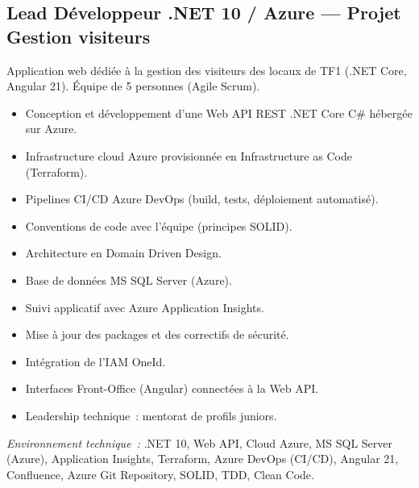 \documentclass[10pt,a4paper]{article}
\begin{document}
\subsection*{Lead Développeur .NET 10 / Azure --- Projet Gestion visiteurs}
\color{darkgray}
Application web dédiée à la gestion des visiteurs des locaux de TF1 (.NET Core, Angular 21). Équipe de 5 personnes (Agile Scrum).
\begin{itemize}
  \item Conception et développement d'une Web API REST .NET Core C\# hébergée sur Azure.
  \item Infrastructure cloud Azure provisionnée en Infrastructure as Code (Terraform).
  \item Pipelines CI/CD Azure DevOps (build, tests, déploiement automatisé).
  \item Conventions de code avec l'équipe (principes SOLID).
  \item Architecture en Domain Driven Design.
  \item Base de données MS SQL Server (Azure).
  \item Suivi applicatif avec Azure Application Insights.
  \item Mise à jour des packages et des correctifs de sécurité.
  \item Intégration de l'IAM OneId.
  \item Interfaces Front-Office (Angular) connectées à la Web API.
  \item Leadership technique~: mentorat de profils juniors.
\end{itemize}
\textit{Environnement technique~:} .NET 10, Web API, Cloud Azure, MS SQL Server (Azure), Application Insights, Terraform, Azure DevOps (CI/CD), Angular 21, Confluence, Azure Git Repository, SOLID, TDD, Clean Code.

\vspace{6pt}
\end{document}
